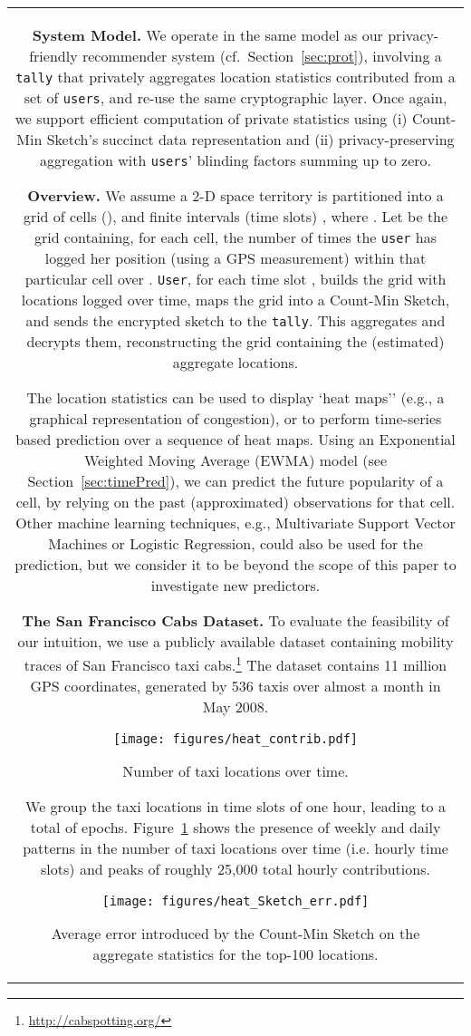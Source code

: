 \documentclass[conference]{IEEEtran}
\newcommand{\descr}[1]{\medskip \noindent \textbf{#1}}
\newcommand{\user}{{\tt user}\xspace}
\newcommand{\users}{{\tt users}\xspace}
\newcommand{\User}{{\tt User}\xspace}
\newcommand{\tally}{{\tt tally}\xspace}
\begin{document}
\begin{figure*}[ht!]
{\begin{tabular}{|c|}
\descr{System Model.} We operate in the same model as our privacy-friendly recommender system (cf.~Section~\ref{sec:prot}), involving a \tally that privately aggregates location statistics contributed from a set of \users, and re-use the same cryptographic layer. Once again, we support efficient computation of private statistics using (i) Count-Min Sketch's succinct data representation and (ii) privacy-preserving aggregation with \users' blinding factors summing up to zero.

\descr{Overview.} We assume a 2-D space territory  is partitioned into a grid of  cells (), and  finite intervals (time slots) , where .
Let  be the grid containing, for each cell, the number of times the \user  has logged her position (using a GPS measurement) within that particular cell over .
\User , for each time slot , builds the grid  with locations logged over time, maps the grid into a Count-Min Sketch, and sends the encrypted sketch to the \tally. 
This aggregates and decrypts them, reconstructing the grid containing the (estimated) aggregate locations. 

The location statistics can be used to display `heat maps'' (e.g., a graphical representation of congestion), or to perform time-series based prediction over a sequence of heat maps.
Using an Exponential Weighted Moving Average (EWMA) model (see Section~\ref{sec:timePred}), we can predict the future popularity of a cell, by relying on the past (approximated) observations for that cell.
Other machine learning techniques, e.g., Multivariate Support Vector Machines or Logistic Regression, could also be used for the prediction, but we consider it to be beyond the scope of this paper to investigate new predictors.

\descr{The San Francisco Cabs Dataset.}
To evaluate the feasibility of our intuition, we use a publicly available dataset containing mobility traces of San Francisco taxi cabs.\footnote{\url{http://cabspotting.org/}}
The dataset contains  11 million GPS coordinates, generated by 536 taxis over almost a month in May 2008. 
\begin{figure}[t]
\centering
\texttt{[image: figures/heat\_contrib.pdf]}
\vspace{-0.15cm}
\caption{\label{fig:heat-slots} Number of taxi locations over time.}
\vspace{-0.2cm}
\end{figure}
We group the taxi locations in time slots of one hour, leading to a total of  epochs.
Figure~\ref{fig:heat-slots} shows 
the presence of weekly and daily patterns in the number of taxi locations over time (i.e. hourly time slots) and peaks of roughly 25,000 total hourly contributions.
\begin{figure}[t]
\centering
\texttt{[image: figures/heat\_Sketch\_err.pdf]}
\vspace{-0.1cm}
\caption{\label{fig:heat-error} Average error introduced by the Count-Min Sketch on the aggregate statistics for the top-100 locations.}
\vspace{-0.25cm}
\end{figure}


\end{tabular}}
\end{figure*}
\end{document}
